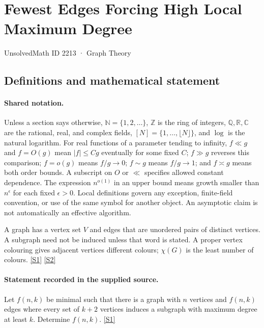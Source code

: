 \documentclass[11pt,a4paper]{article}
\newcommand{\N}{\mathbb{N}}
\newcommand{\Z}{\mathbb{Z}}
\newcommand{\Q}{\mathbb{Q}}
\newcommand{\R}{\mathbb{R}}
\newcommand{\C}{\mathbb{C}}
\newcommand{\sref}[2]{\hyperlink{source:#1:#2}{[S#2]}}
\begin{document}

\setcounter{section}{2212}

\section{Fewest Edges Forcing High Local Maximum Degree}\label{2213}

{\small\sffamily UnsolvedMath ID 2213 · Graph Theory}

\subsection{Definitions and mathematical statement}

\paragraph{Shared notation.}Unless a section says otherwise, $\N=\{1,2,\ldots\}$,
$\Z$ is the ring of integers, $\Q,\R,\C$ are the rational, real, and complex
fields, $[N]=\{1,\ldots,\lfloor N\rfloor\}$, and $\log$ is the natural
logarithm. For real functions of a parameter tending to infinity,
$f\ll g$ and $f=O(g)$ mean $|f|\leq Cg$ eventually for some fixed $C$;
$f\gg g$ reverses this comparison; $f=o(g)$ means $f/g\to0$;
$f\sim g$ means $f/g\to1$; and $f\asymp g$ means both order bounds.
A subscript on $O$ or $\ll$ specifies allowed constant dependence.
The expression $n^{o(1)}$ in an upper bound means growth smaller than
$n^\epsilon$ for each fixed $\epsilon>0$. Local definitions govern any
exception, finite-field convention, or use of the same symbol for another
object. An asymptotic claim is not automatically an effective algorithm.



A graph has a vertex set $V$ and edges that are unordered pairs of distinct vertices. A subgraph need not be induced unless that word is stated. A proper vertex colouring gives adjacent vertices different colours; $\chi(G)$ is the least number of colours. \sref{2213}{1} \sref{2213}{2}

\paragraph{Statement recorded in the supplied source.}
Let $f(n,k)$ be minimal such that there is a graph with $n$ vertices and $f(n,k)$ edges where every set of $k+2$ vertices induces a subgraph with maximum degree at least $k$. Determine $f(n,k)$. \sref{2213}{1}
\end{document}
